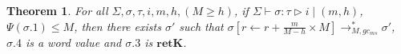 \documentclass[fleqn]{article}
\newtheorem{theorem}{Theorem}
\begin{document}
\begin{theorem}
	For all $\Sigma,\sigma,\tau,i,m,h,(M \ge h)$, if $\Sigma \vdash \sigma : \tau \triangleright i \mid (m,h)$, $\Psi(\sigma.1) \le M$,
	then there exists $\sigma'$ such that $\sigma[r \leftarrow r+ \frac{m}{M-h}\times M] \longrightarrow_{M,gc_{ms}}^* \sigma'$,
	$\sigma.4$ is a word value and $\sigma.3$ is $\mathbf{retK}$.
\end{theorem}
\end{document}
